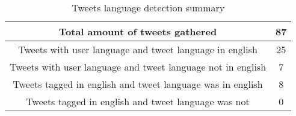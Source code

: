 \begin{table}[H]
  \caption{Tweets language detection summary }
  \label{tab:mac_test}
  \begin{center}
    \begin{tabular}{|c|c|}
      \hline
      Total amount of tweets gathered      & 87  \\
      \hline
      \hline
      Tweets with user language and tweet language in english      & 25  \\
      \hline
      Tweets with user language and tweet language not in english      & 7  \\
      \hline
      \hline
      Tweets tagged in english and tweet language was in english      & 8  \\
      \hline
      Tweets tagged in english and tweet language was not       & 0  \\
      \hline
    \end{tabular}
  \end{center}
\end{table}
